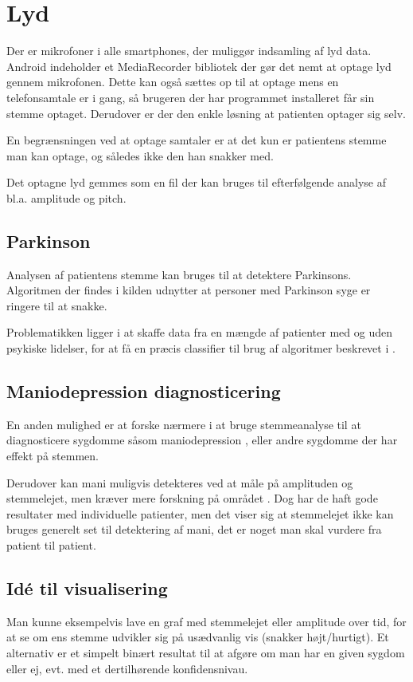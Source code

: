 \section{Lyd}
Der er mikrofoner i alle smartphones, der muliggør indsamling af lyd data.
Android indeholder et MediaRecorder bibliotek der gør det nemt at optage lyd gennem mikrofonen. Dette kan også sættes op til at optage mens en telefonsamtale er i gang, så brugeren der har programmet installeret får sin stemme optaget.
Derudover er der den enkle løsning at patienten optager sig selv.

En begrænsningen ved at optage samtaler er at det kun er patientens stemme man kan optage, og således ikke den han snakker med.

Det optagne lyd gemmes som en fil der kan bruges til efterfølgende analyse af bl.a. amplitude og pitch.

\subsection{Parkinson}
Analysen af patientens stemme kan bruges til at detektere Parkinsons\citep{6168572}.
Algoritmen der findes i kilden udnytter at personer med Parkinson syge er ringere til at snakke.

Problematikken ligger i at skaffe data fra en mængde af patienter med og uden psykiske lidelser, for at få en præcis classifier til brug af algoritmer beskrevet i \citep{6168572,6346375}.

\subsection{Maniodepression diagnosticering}
En anden mulighed er at forske nærmere i at bruge stemmeanalyse til at diagnosticere sygdomme såsom maniodepression \citep{6346375}, eller andre sygdomme der har effekt på stemmen.

Derudover kan mani muligvis detekteres ved at måle på amplituden og stemmelejet, men kræver mere forskning på området \citep{6346375}.
Dog har de haft gode resultater med individuelle patienter, men det viser sig at stemmelejet ikke kan bruges generelt set til detektering af mani, det er noget man skal vurdere fra patient til patient.
	
\subsection{Idé til visualisering}
Man kunne eksempelvis lave en graf med stemmelejet eller amplitude over tid, for at se om ens stemme udvikler sig på usædvanlig vis (snakker højt/hurtigt).
Et alternativ er et simpelt binært resultat til at afgøre om man har en given sygdom eller ej, evt. med et dertilhørende konfidensnivau.
